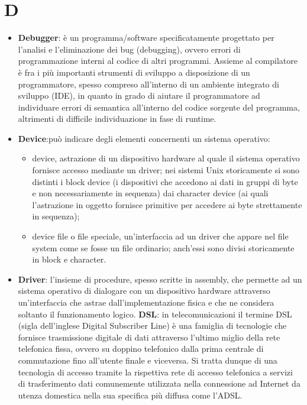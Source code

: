 \section{D}
\begin{itemize} 
	\item
	\textbf{Debugger}: è un programma/software specificatamente progettato per l'analisi e l'eliminazione dei bug (debugging), ovvero errori di programmazione interni al codice di altri programmi. Assieme al compilatore è fra i più importanti strumenti di sviluppo a disposizione di un programmatore, spesso compreso all'interno di un ambiente integrato di sviluppo (IDE), in quanto in grado di aiutare il programmatore ad individuare errori di semantica all'interno del codice sorgente del programma, altrimenti di difficile individuazione in fase di runtime.
	\item
	\textbf{Device}:può indicare degli elementi concernenti un sistema operativo:
	 \begin{itemize} 
	\item
    device, astrazione di un dispositivo hardware al quale il sistema operativo fornisce accesso mediante un driver; nei sistemi Unix storicamente si sono distinti i block device (i dispositivi che accedono ai dati in gruppi di byte e non necessariamente in sequenza) dai character device (ai quali l'astrazione in oggetto fornisce primitive per accedere ai byte strettamente in sequenza);
 	\item  
    device file o file speciale, un'interfaccia ad un driver che appare nel file system come se fosse un file ordinario; anch'essi sono divisi storicamente in block e character.
	\end{itemize}
	\item
	\textbf{Driver}: l'insieme di procedure, spesso scritte in assembly, che permette ad un sistema operativo di dialogare con un dispositivo hardware attraverso un'interfaccia che astrae dall'implementazione fisica e che ne considera soltanto il funzionamento logico.
	\textbf{DSL}: in telecomunicazioni il termine DSL (sigla dell'inglese Digital Subscriber Line) è una famiglia di tecnologie che fornisce trasmissione digitale di dati attraverso l'ultimo miglio della rete telefonica fissa, ovvero su doppino telefonico dalla prima centrale di commutazione fino all'utente finale e viceversa.
	Si tratta dunque di una tecnologia di accesso tramite la rispettiva rete di accesso telefonica a servizi di trasferimento dati comunemente utilizzata nella connessione ad Internet da utenza domestica nella sua specifica più diffusa come l'ADSL. 
\end{itemize}
